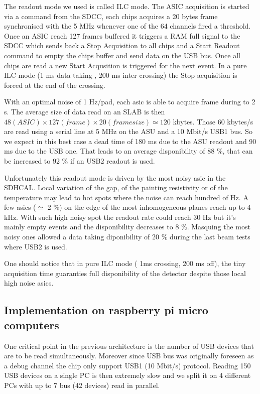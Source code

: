 \documentclass[english]{article}
\begin{document}
The readout mode we used is called ILC mode. The ASIC acquisition is started via a command from the SDCC, each chips acquires a 20 bytes frame synchronised with the 5 MHz whenever one of the 64 channels fired a threshold.
Once an ASIC reach 127 frames buffered it triggers a RAM full  signal to the SDCC which sends back a Stop Acquisition to all chips and a Start Readout command to empty the chips buffer and send data on the USB bus. Once all chips are read a new Start Acqusition is triggered for the next event. In a pure ILC mode (1 ms data taking , 200 ms inter crossing) the Stop acquisition is forced at the end of the crossing.

With an optimal noise of 1 Hz/pad, each asic is able to acquire frame during to 2 s. The average size of data read on an SLAB is then $ 48 (ASIC) \times 127 (frame) \times 20 (frame size) \simeq 120 $ kbytes. Those 60 kbytes/s are read using a serial line at 5 MHz on the ASU and a 10 Mbit/s USB1 bus. So we expect in this  best case a dead time of 180 ms due to the ASU readout and 90 ms due to the USB one. That leads to an average disponibility of 88 \%, that can be increased to 92 \% if an USB2 readout is used.

Unfortunately this readout mode is driven by the most noisy asic in the SDHCAL. Local variation of the gap, of the painting resistivity or of the temperature may lead to hot spots where the noise can reach hundred of Hz. A few asics ($ \simeq $ 2 \%) on the edge of the most inhomogeneous  planes reach up to 4 kHz. With such high noisy spot the readout rate could reach 30 Hz but it's mainly empty events and the disponibility decreases to 8 \%. Masquing the most noisy ones allowed a data taking diponibility of 20 \% during the last beam tests where USB2 is used.

One should notice that in pure ILC mode ( 1ms crossing, 200 ms off), the tiny acquisition time guaranties full disponibility of the detector despite those local high noise asics.               


\subsection{Implementation on raspberry pi micro computers}

One critical point in the previous architecture is the number of USB devices that are to be read simultaneously. Moreover since USB bus was originally foreseen as a debug channel the chip only support USB1 (10 Mbit/s) protocol. Reading  150 USB devices on a single PC is then extremely slow and we split it on 4 different PCs with up to 7 bus (42 devices) read in parallel.    
\end{document}
